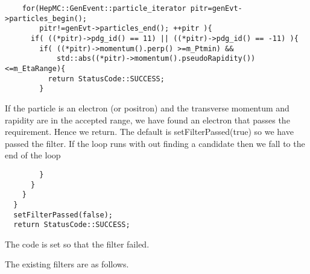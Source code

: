 \documentclass[11pt]{article}
\begin{document}
\begin{verbatim}
    for(HepMC::GenEvent::particle_iterator pitr=genEvt->particles_begin();
        pitr!=genEvt->particles_end(); ++pitr ){
      if( ((*pitr)->pdg_id() == 11) || ((*pitr)->pdg_id() == -11) ){
        if( ((*pitr)->momentum().perp() >=m_Ptmin) && 
            std::abs((*pitr)->momentum().pseudoRapidity()) <=m_EtaRange){
          return StatusCode::SUCCESS;
        }
\end{verbatim}
If the particle is an electron (or positron) and the   transverse momentum
and rapidity are in the accepted range, we have found an electron that
passes the requirement. Hence we return. The default is
setFilterPassed(true) so we have passed the filter. If the loop runs
with out finding a candidate then we fall to the end of the loop

\begin{verbatim}
        }
      }
    }   
  }
  setFilterPassed(false);
  return StatusCode::SUCCESS;
\end{verbatim}

The code is set so that the filter failed.

The existing filters are as follows.
\end{document}
